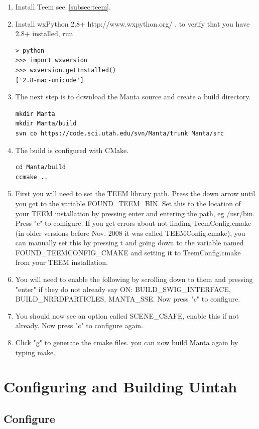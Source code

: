\documentclass[12pt]{article}
\begin{document}
\begin{enumerate}
\item
Install Teem see~\ref{subsec:teem}.
\item
Install wxPython 2.8+ http://www.wxpython.org/ .  
to verify that you have 2.8+ installed, run
\begin{verbatim}
> python
>>> import wxversion
>>> wxversion.getInstalled()
['2.8-mac-unicode']
\end{verbatim}
\item
The next step is to download the Manta source and create a build directory.
\begin{verbatim}
mkdir Manta
mkdir Manta/build
svn co https://code.sci.utah.edu/svn/Manta/trunk Manta/src
\end{verbatim}
\item
The build is configured with CMake.
\begin{verbatim}
cd Manta/build
ccmake ..
\end{verbatim}
\item First you will need to set the TEEM library path. Press the down
  arrow until you get to the variable FOUND\_TEEM\_BIN. Set this to
  the location of your TEEM installation by pressing enter and
  entering the path, eg /usr/bin. Press "c" to configure. If you get
  errors about not finding TeemConfig.cmake (in older versions before
  Nov. 2008 it was called TEEMConfig.cmake), you can manually set this
  by pressing t and going down to the variable named
  FOUND\_TEEMCONFIG\_CMAKE and setting it to TeemConfig.cmake from
  your TEEM installation.
\item You will need to enable the following by scrolling down to them
  and pressing "enter" if they do not already say ON:
  BUILD\_SWIG\_INTERFACE, BUILD\_NRRDPARTICLES, MANTA\_SSE. Now press
  "c" to configure.
 \item
 You should now see an option called SCENE\_CSAFE, enable this if not already. Now press "c" to configure again. 
 \item
 Click "g" to generate the cmake files. you can now build Manta again by typing make. 
\end{enumerate}

\section{Configuring and Building Uintah}

\subsection{Configure}
\end{document}
